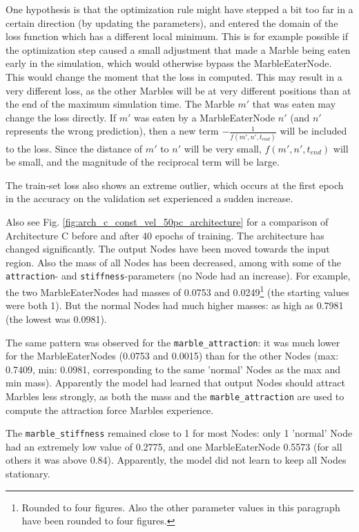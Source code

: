 One hypothesis is that the optimization rule might have stepped a bit too far in a certain direction (by updating the parameters), 
and entered the domain of the loss function which has a different local minimum. 
This is for example possible if the optimization step caused a small adjustment that made a Marble being eaten early in the simulation, 
which would otherwise bypass the MarbleEaterNode. This would change the moment that the loss in computed. 
This may result in a very different loss, as the other Marbles will be at very different positions than at the end of the maximum simulation time.
The Marble $m'$ that was eaten may change the loss directly. 
If $m'$ was eaten by a MarbleEaterNode $n'$ (and $n'$ represents the wrong prediction), 
then a new term $- \frac{1}{f(m', n', t_{end})}$ will be included to the loss. 
Since the distance of $m'$ to $n'$ will be very small, $f(m', n', t_{end})$ will be small,
and the magnitude of the reciprocal term will be large.

The train-set loss also shows an extreme outlier, which occurs at the first epoch in the accuracy on the validation set experienced a sudden increase. 

Also see Fig. \ref{fig:arch_c_const_vel_50pc_architecture} for a comparison of Architecture C before and after 40 epochs of training. The architecture has changed significantly. The output Nodes have been moved towards the input region. Also the mass of all Nodes has been decreased, among with some of the \texttt{attraction}- and \texttt{stiffness}-parameters (no Node had an increase). For example, the two MarbleEaterNodes had masses of 0.0753 and 0.0249\footnote{Rounded to four figures. Also the other parameter values in this paragraph have been rounded to four figures.} (the starting values were both 1). But the normal Nodes had much higher masses: as high as 0.7981 (the lowest was 0.0981).

The same pattern was observed for the \texttt{marble\_attraction}: 
it was much lower for the MarbleEaterNodes (0.0753 and 0.0015) 
than for the other Nodes 
(max: 0.7409, min: 0.0981, corresponding to the same 'normal' Nodes as the max and min mass).
Apparently the model had learned that output Nodes should attract Marbles less strongly, 
as both the mass and the \texttt{marble\_attraction} are used to compute the attraction force Marbles experience.

The \texttt{marble\_stiffness} remained close to 1 for most Nodes: only 1 'normal' Node had an extremely low value of 0.2775, and one MarbleEaterNode 0.5573 (for all others it was above 0.84). Apparently, the model did not learn to keep all Nodes stationary. 

